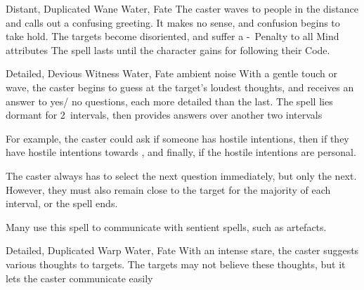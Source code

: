\ifodd\value{diceNo}

  {Distant, Duplicated}%
  {Wane}%
  {Water, Fate}%
  {}%
  {
    The caster waves to people in the distance and calls out a confusing greeting.
    It makes no sense, and confusion begins to take hold.
    The targets become disoriented, and suffer a -~Penalty to all Mind \glspl{attribute}}%
  {
    The spell lasts until the character gains  for following their Code.
  }

\else

  {Detailed, Devious}%
  {Witness}%
  {Water, Fate}%
  {ambient noise}%
  {With a gentle touch or wave, the caster begins to guess at the target's loudest thoughts, and receives an answer to  yes/ no questions, each more detailed than the last.
  The spell lies dormant for 2~\glspl{interval}, then provides answers over another two \glspl{interval}}%
  {
  For example, the caster could ask if someone has hostile intentions, then if they have hostile intentions towards , and finally, if the hostile intentions are personal.

  The caster always has to select the next question immediately, but only the next.
  However, they must also remain close to the target for the majority of each \gls{interval}, or the spell ends.

  Many use this spell to communicate with sentient spells, such as \glspl{artefact}.}

  {Detailed, Duplicated}%
  {Warp}%
  {Water, Fate}%
  {}%
  {With an intense stare, the caster suggests various thoughts to  targets.
  The targets may not believe these thoughts, but it lets the caster communicate easily}%
  {}

\fi
{}
